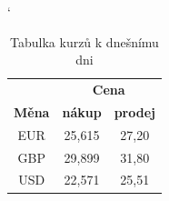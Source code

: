 \documentclass[a4paper,11pt]{article}
\begin{document}
\medskip

\begin{table}[h]

 \centering
    \catcode`
    \begin{tabular}{|c|c|c|}
    
     \hline
     & \multicolumn{2}{c}{\bfseries Cena}\vline\\
     \cline{2-3}
     
     \textbf{Měna} & \textbf{nákup} & \textbf{prodej}\\
     \hline
     EUR & 25,615 & 27,20 \\ 
     GBP & 29,899 & 31,80 \\ 
     USD & 22,571 & 25,51 \\ 
     \hline
    \end{tabular}
    \caption[Data]{Tabulka kurzů k dnešnímu dni}
    \label{table:kurz}
\end{table}

\bigskip
\end{document}
